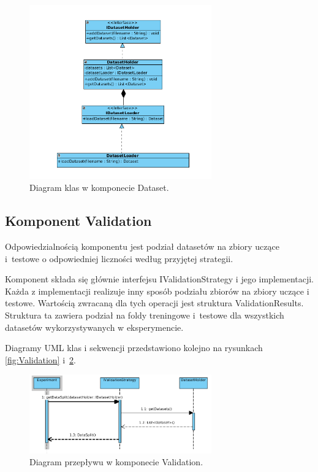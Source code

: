 \documentclass[12pt]{article}
\begin{document}
\begin{figure}[!h]
\centering
	\includegraphics[width=0.7\textwidth]{img/class_diagrams/dataset.png}
	\caption{Diagram klas w komponecie Dataset.}
	\label{fig:classDataset}
\end{figure}
\newpage

\subsection{Komponent Validation}

Odpowiedzialnością komponentu jest podział datasetów na zbiory uczące i~testowe o odpowiedniej liczności według przyjętej strategii.

Komponent składa się głównie interfejsu IValidationStrategy i jego implementacji. Każda z implementacji realizuje inny sposób podziału zbiorów na zbiory uczące i testowe. Wartością zwracaną dla tych operacji jest struktura ValidationResults. Struktura ta zawiera podział na foldy treningowe i~testowe dla wszystkich datasetów wykorzystywanych w eksperymencie. 

Diagramy UML klas i sekwencji przedstawiono kolejno na rysunkach \ref{fig:Validation} i~\ref{fig:sequenceValidation}.

\begin{figure}[!h]
	\centering
	\includegraphics[width=0.7\textwidth]{img/sequenceValidation.png}
	\caption{Diagram przepływu w komponecie Validation.}
	\label{fig:sequenceValidation}
\end{figure}
\end{document}
